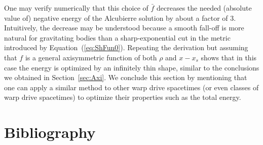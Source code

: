 \documentclass[10pt]{iopart}
\begin{document}
One may verify numerically that this choice of $\bar{f}$ decreases the needed (absolute value of) negative energy of the Alcubierre solution by about a factor of 3. Intuitively, the decrease may be understood because a smooth fall-off is more natural for gravitating bodies than a sharp-exponential cut in the metric introduced by Equation~(\ref{eq:ShFun0}). Repeating the derivation but assuming that $f$ is a general axisymmetric function of both $\rho$ and $x-x_s$ shows that in this case the energy is optimized by an infinitely thin shape, similar to the conclusions we obtained in Section~\ref{sec:Axi}. We conclude this section by mentioning that one can apply a similar method to other warp drive spacetimes (or even classes of warp drive spacetimes) to optimize their properties such as the total energy. 



    

\section*{Bibliography}



\end{document}
